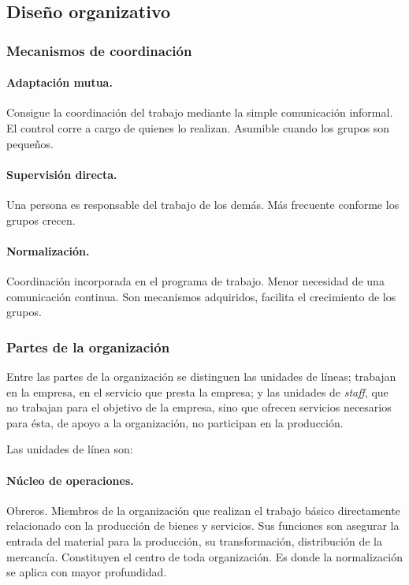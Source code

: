 \documentclass[12pt]{article}
\theoremstyle{definition_wo_parentheses}
\begin{document}
\subsection{Diseño organizativo}

\subsubsection{Mecanismos de coordinación}

\paragraph{Adaptación mutua.} Consigue la coordinación del trabajo mediante la simple comunicación informal. El control corre a cargo de quienes lo realizan. Asumible cuando los grupos son pequeños.

\paragraph{Supervisión directa.} Una persona es responsable del trabajo de los demás. Más frecuente conforme los grupos crecen.

\paragraph{Normalización.} Coordinación incorporada en el programa de trabajo. Menor necesidad de una comunicación continua. Son mecanismos adquiridos, facilita el crecimiento de los grupos.

\subsubsection{Partes de la organización}

Entre las partes de la organización se distinguen las unidades de líneas; trabajan en la empresa, en el servicio que presta la empresa; y las unidades de \textit{staff}, que no trabajan para el objetivo de la empresa, sino que ofrecen servicios necesarios para ésta, de apoyo a la organización, no participan en la producción.

Las unidades de línea son:
\paragraph{Núcleo de operaciones.} Obreros. Miembros de la organización que realizan el trabajo básico directamente relacionado con la producción de bienes y servicios. Sus funciones son asegurar la entrada del material para la producción, su transformación, distribución de la mercancía. Constituyen el centro de toda organización. Es donde la normalización se aplica con mayor profundidad.
\end{document}
